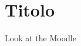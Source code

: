 \documentclass[../template.tex]{subfiles}
\begin{document}
\section{Titolo}
Look at the Moodle
\end{document}

